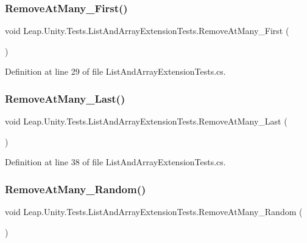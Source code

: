 \subsubsection{\texorpdfstring{RemoveAtMany\_First()}{RemoveAtMany\_First()}}
{\footnotesize\ttfamily void Leap.\+Unity.\+Tests.\+List\+And\+Array\+Extension\+Tests.\+Remove\+At\+Many\+\_\+\+First (\begin{DoxyParamCaption}{ }\end{DoxyParamCaption})}



Definition at line 29 of file List\+And\+Array\+Extension\+Tests.\+cs.

\mbox{\label{class_leap_1_1_unity_1_1_tests_1_1_list_and_array_extension_tests_a778b1a1071d9ed1abd2a85589647dce6}} 
\subsubsection{\texorpdfstring{RemoveAtMany\_Last()}{RemoveAtMany\_Last()}}
{\footnotesize\ttfamily void Leap.\+Unity.\+Tests.\+List\+And\+Array\+Extension\+Tests.\+Remove\+At\+Many\+\_\+\+Last (\begin{DoxyParamCaption}{ }\end{DoxyParamCaption})}



Definition at line 38 of file List\+And\+Array\+Extension\+Tests.\+cs.

\mbox{\label{class_leap_1_1_unity_1_1_tests_1_1_list_and_array_extension_tests_ac0182d00b85b4201d4d3d4529b97a41f}} 
\subsubsection{\texorpdfstring{RemoveAtMany\_Random()}{RemoveAtMany\_Random()}}
{\footnotesize\ttfamily void Leap.\+Unity.\+Tests.\+List\+And\+Array\+Extension\+Tests.\+Remove\+At\+Many\+\_\+\+Random (\begin{DoxyParamCaption}{ }\end{DoxyParamCaption})}



